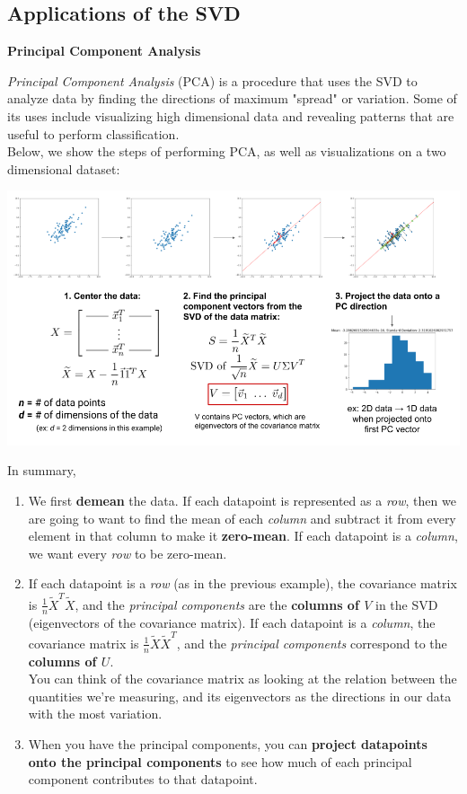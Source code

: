 \renewcommand{\arraystretch}{1.25}
\subsection*{Applications of the SVD}
\textbf{Principal Component Analysis}

\textit{Principal Component Analysis} (PCA) is a procedure that uses the SVD to analyze data by finding the directions of maximum "spread" or variation. Some of its uses include visualizing high dimensional data and revealing patterns that are useful to perform classification.\\
\newline
Below, we show the steps of performing PCA, as well as visualizations on a two dimensional dataset:

\includegraphics[width=\textwidth]{figures/pca-steps}

In summary,
\begin{enumerate}
    \item We first \textbf{demean} the data. If each datapoint is represented as a \textit{row}, then we are going to want to find the mean of each \textit{column} and subtract it from every element in that column to make it \textbf{zero-mean}. If each datapoint is a \textit{column}, we want every \textit{row} to be zero-mean.
    \item If each datapoint is a \textit{row} (as in the previous example), the covariance matrix is $\frac{1}{n} \widetilde{X}^T\widetilde{X}$, and the \textit{principal components} are the \textbf{columns of $V$} in the SVD (eigenvectors of the covariance matrix). 
    If each datapoint is a \textit{column}, the covariance matrix is $\frac{1}{n} \widetilde{X}\widetilde{X}^T$, and the \textit{principal components} correspond to the \textbf{columns of $U$}. \\
    \newline
    You can think of the covariance matrix as looking at the relation between the quantities we're measuring, and its eigenvectors as the directions in our data with the most variation.
    \item When you have the principal components, you can \textbf{project datapoints onto the principal components} to see how much of each principal component contributes to that datapoint.
\end{enumerate}

